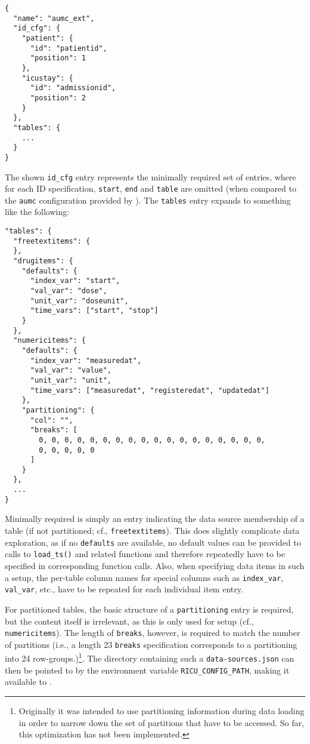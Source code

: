 \documentclass[
  notitle,
  nojss,
  noheadings]{jss}
\begin{document}
\begin{verbatim}
{
  "name": "aumc_ext",
  "id_cfg": {
    "patient": {
      "id": "patientid",
      "position": 1
    },
    "icustay": {
      "id": "admissionid",
      "position": 2
    }
  },
  "tables": {
    ...
  }
}
\end{verbatim}

The shown \texttt{id\_cfg} entry represents the minimally required set
of entries, where for each ID specification, \texttt{start},
\texttt{end} and \texttt{table} are omitted (when compared to the
\texttt{aumc} configuration provided by ). The \texttt{tables}
entry expands to something like the following:

\begin{verbatim}
"tables": {
  "freetextitems": {
  },
  "drugitems": {
    "defaults": {
      "index_var": "start",
      "val_var": "dose",
      "unit_var": "doseunit",
      "time_vars": ["start", "stop"]
    }
  },
  "numericitems": {
    "defaults": {
      "index_var": "measuredat",
      "val_var": "value",
      "unit_var": "unit",
      "time_vars": ["measuredat", "registeredat", "updatedat"]
    },
    "partitioning": {
      "col": "",
      "breaks": [
        0, 0, 0, 0, 0, 0, 0, 0, 0, 0, 0, 0, 0, 0, 0, 0, 0, 0,
        0, 0, 0, 0, 0
      ]
    }
  },
  ...
}
\end{verbatim}

Minimally required is simply an entry indicating the data source
membership of a table (if not partitioned; cf., \texttt{freetextitems}).
This does slightly complicate data exploration, as if no
\texttt{defaults} are available, no default values can be provided to
calls to \texttt{load\_ts()} and related functions and therefore
repeatedly have to be specified in corresponding function calls. Also,
when specifying data items in such a setup, the per-table column names
for special columns such as \texttt{index\_var}, \texttt{val\_var},
etc., have to be repeated for each individual item entry.

For partitioned tables, the basic structure of a \texttt{partitioning}
entry is required, but the content itself is irrelevant, as this is only
used for setup (cf., \texttt{numericitems}). The length of
\texttt{breaks}, however, is required to match the number of partitions
(i.e., a length 23 \texttt{breaks} specification corresponds to a
partitioning into 24 row-groups.)\footnote{Originally it was intended to
  use partitioning information during data loading in order to narrow
  down the set of partitions that have to be accessed. So far, this
  optimization has not been implemented.}. The directory containing such
a \texttt{data-sources.json} can then be pointed to by the environment
variable \texttt{RICU\_CONFIG\_PATH}, making it available to .
\end{document}

